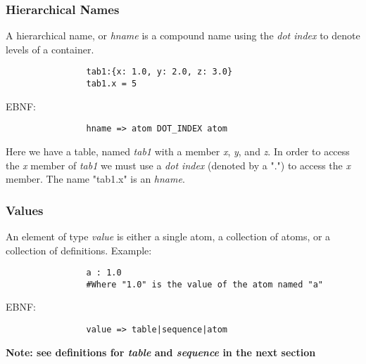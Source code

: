 \documentclass{memarticle}
\begin{document}
		\subsubsection{Hierarchical Names}
			A hierarchical name,
			or \emph{hname} is a compound name 
			using the \emph{dot index} to denote levels of a container.
			\begin{verbatim}
				tab1:{x: 1.0, y: 2.0, z: 3.0}
				tab1.x = 5
			\end{verbatim}
			\vspace{1mm}
			\par
			EBNF:
			\begin{verbatim}
				hname => atom DOT_INDEX atom
			\end{verbatim}
			\vspace{1mm}
			\par
			Here we have a table, named \emph{tab1} with a member \emph{x}, \emph{y}, and \emph{z}. 
			In order to access the \emph{x} member of \emph{tab1}
			we must use a \emph{dot index} 
			(denoted by a ".") 
			to access the \emph{x} member.
			\break
			\break
			The name "tab1.x"
			is an \emph{hname}.
	
		\subsubsection{Values}
			An element of type \emph{value} is either a single atom, 
			a collection of atoms,
			or a collection of definitions.
			Example:
			\begin{verbatim}
				a : 1.0
				#Where "1.0" is the value of the atom named "a"
			\end{verbatim}
			
			\vspace{1mm}
			\par
			EBNF:
			\begin{verbatim}
				value => table|sequence|atom
			\end{verbatim}	
			\vspace{1mm}
			\par
			\bf Note: \rm see definitions for \emph{table} 
			and \emph{sequence} 
			in the next section
\end{document}
